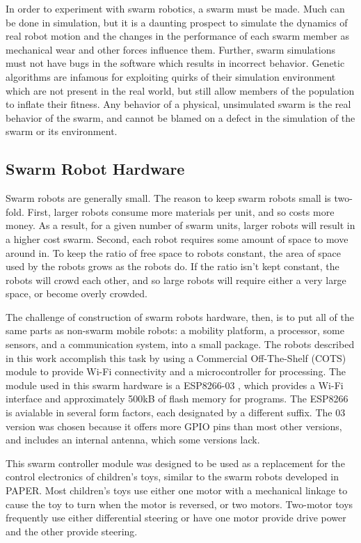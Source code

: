 \documentclass[]{article}
\begin{document}
In order to experiment with swarm robotics, a swarm must be made.
Much can be done in simulation, but it is a daunting prospect to simulate the dynamics of real robot motion and the changes in the performance of each swarm member as mechanical wear and other forces influence them. 
Further, swarm simulations must not have bugs in the software which results in incorrect behavior. 
Genetic algorithms are infamous for exploiting quirks of their simulation environment which are not present in the real world, but still allow members of the population to inflate their fitness. 
Any behavior of a physical, unsimulated swarm is the real behavior of the swarm, and cannot be blamed on a defect in the simulation of the swarm or its environment. 

\subsection{Swarm Robot Hardware}

Swarm robots are generally small. 
The reason to keep swarm robots small is two-fold. 
First, larger robots consume more materials per unit, and so costs more money.
As a result, for a given number of swarm units, larger robots will result in a higher cost swarm. 
Second, each robot requires some amount of space to move around in. 
To keep the ratio of free space to robots constant, the area of space used by the robots grows as the robots do. 
If the ratio isn't kept constant, the robots will crowd each other, and so large robots will require either a very large space, or become overly crowded.

The challenge of construction of swarm robots hardware, then, is to put all of the same parts as non-swarm mobile robots: a mobility platform, a processor, some sensors, and a communication system, into a small package.  
The robots described in this work accomplish this task by using a Commercial Off-The-Shelf (COTS) module to provide Wi-Fi connectivity and a microcontroller for processing. 
The module used in this swarm hardware is a ESP8266-03  , which provides a Wi-Fi interface and approximately 500kB of flash memory for programs. 
The ESP8266 is avialable in several form factors, each designated by a different suffix. 
The 03 version was chosen because it offers more GPIO pins than most other versions, and includes an internal antenna, which some versions lack. 

This swarm controller module was designed to be used as a replacement for the control electronics of children's toys, similar to the  swarm robots developed in PAPER. 
Most children's toys use either one motor with a mechanical linkage to cause the toy to turn when the motor is reversed, or two motors.
Two-motor toys frequently use either differential steering or have one motor provide drive power and the other provide steering. 
\end{document}
